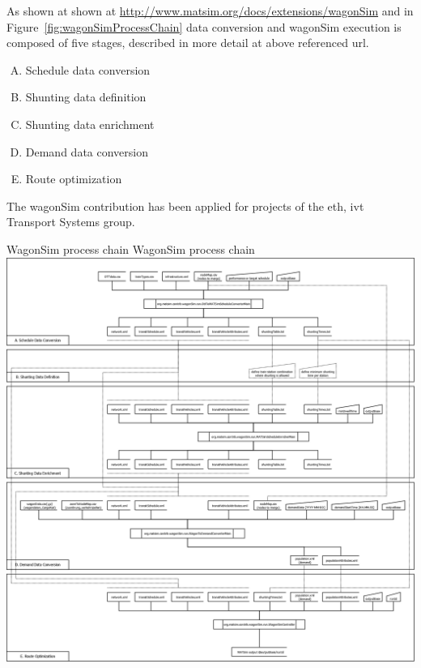 As shown at shown at \url{http://www.matsim.org/docs/extensions/wagonSim} and in Figure~\ref{fig:wagonSimProcessChain} data conversion and wagonSim execution is composed of five stages, described in more detail at above referenced url.
%
\begin{enumerate}[(A)]
\item Schedule data conversion
\item Shunting data definition
\item Shunting data enrichment
\item Demand data conversion
\item Route optimization
\end{enumerate}
%
The wagonSim \gls{contribution} has been applied for projects of the \gls{eth}, \gls{ivt} Transport Systems group.

\createfigure%
{WagonSim process chain}%
{WagonSim process chain}%
{\label{fig:wagonSimProcessChain}}%
{\includegraphics[width=1.\textwidth,angle=90]{extending/figures/wagonsim/wagonSimProcessChain.png}}%
{}

